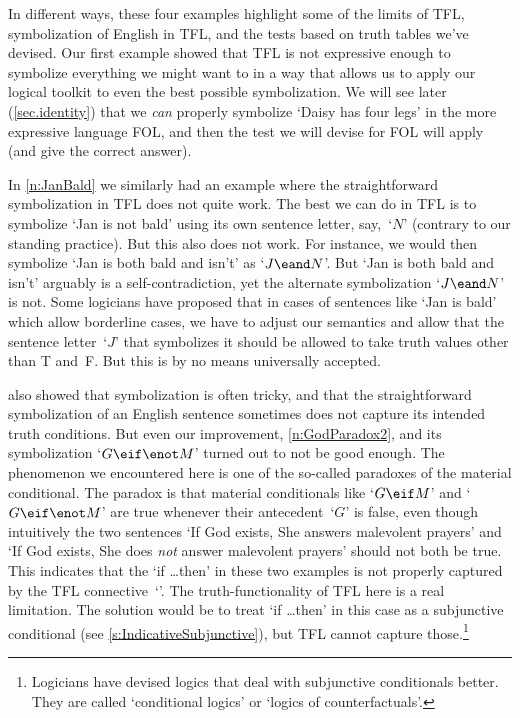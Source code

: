 In different ways, these four examples highlight some of the limits of
TFL, symbolization of English in TFL, and the tests based on truth
tables we've devised. Our first example showed that TFL is not
expressive enough to symbolize everything we might want to in a way
that allows us to apply our logical toolkit to even the best possible
symbolization. We will see later (\cref{sec.identity}) that we
\emph{can} properly symbolize `Daisy has four legs' in the more
expressive language FOL, and then the test we will devise for FOL will
apply (and give the correct answer).

In \cref{n:JanBald} we similarly had an example where the
straightforward symbolization in TFL does not quite work. The best we
can do in TFL is to symbolize `Jan is not bald' using its own sentence
letter, say,~`$N$' (contrary to our standing practice). But this also
does not work. For instance, we would then symbolize `Jan is both bald
and isn't' as `$J \eand N$'. But `Jan is both bald and isn't' arguably
is a self-contradiction, yet the alternate symbolization `$J \eand N$'
is not. Some logicians have proposed that in cases of sentences like
`Jan is bald' which allow borderline cases, we have to adjust our
semantics and allow that the sentence letter~`$J$' that symbolizes it
should be allowed to take truth values other than T and~F. But this is
by no means universally accepted.

 also showed that symbolization is often tricky,
and that the straightforward symbolization of an English sentence
sometimes does not capture its intended truth conditions. But even our
improvement, \cref{n:GodParadox2}, and its symbolization `$G \eif
\enot M$' turned out to not be good enough. The phenomenon we
encountered here is one of the so-called paradoxes of the material
conditional. The paradox is that material conditionals like
`$G \eif M$' and `$G \eif \enot M$' are true whenever their
antecedent~`$G$' is false, even though intuitively the two sentences
`If God exists, She answers malevolent prayers' and `If God exists,
She does \emph{not} answer malevolent prayers' should not both be true. This
indicates that the `if \dots then' in these two examples is not
properly captured by the TFL connective~`\eif'. The
truth-functionality of TFL here is a real limitation. The solution
would be to treat `if \dots then' in this case as a subjunctive
conditional (see \cref{s:IndicativeSubjunctive}), but TFL cannot
capture those.\footnote{Logicians have devised logics that deal with
subjunctive conditionals better. They are called `conditional logics'
or `logics of counterfactuals'.}

